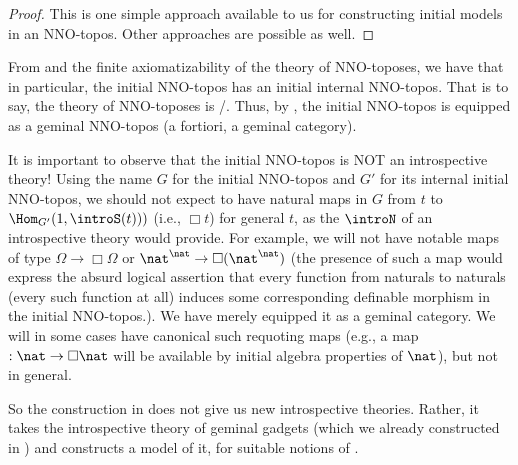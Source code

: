 \begin{proof}
This is one simple approach available to us for constructing initial models in an NNO-topos. Other approaches are possible as well. 

\end{proof}

From  and the finite axiomatizability of the theory of NNO-toposes, we have that in particular, the initial NNO-topos has an initial internal NNO-topos. That is to say, the theory of NNO-toposes is \initogeminal/. Thus, by , the initial NNO-topos is equipped as a geminal NNO-topos (a fortiori, a geminal category).

\begin{warningenv}\label{InitoGeminalWarning}
It is important to observe that the initial NNO-topos is NOT an introspective theory! Using the name $G$ for the initial NNO-topos and $G'$ for its internal initial NNO-topos, we should not expect to have natural maps in $G$ from $t$ to $\Hom_{G'}(1, \introS(t)))$ (i.e., $\Box t$) for general $t$, as the $\introN$ of an introspective theory would provide. For example, we will not have notable maps of type $\Omega \to \Box \Omega$ or $\nat^{\nat} \to \Box(\nat^{\nat})$ (the presence of such a map would express the absurd logical assertion that every function from naturals to naturals (every such function at all) induces some corresponding definable morphism in the initial NNO-topos.). We have merely equipped it as a geminal category. We will in some cases have canonical such requoting maps (e.g., a map $: \nat \to \Box \nat$ will be available by initial algebra properties of $\nat$), but not in general.

So the construction in  does not give us new introspective theories. Rather, it takes the introspective theory of geminal gadgets (which we already constructed in \TODO) and constructs a model of it, for suitable notions of .
\end{warningenv}

